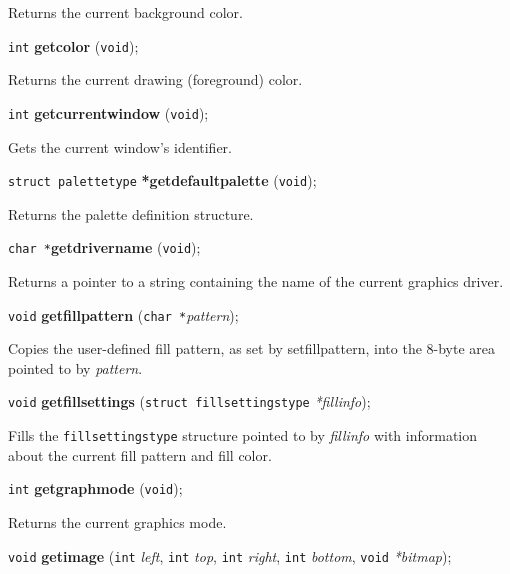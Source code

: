 \documentclass[a4paper,11pt]{article}
\newcommand{\V}{\texttt{void}}      %
\newcommand{\I}{\texttt{int}}       %
\newcommand{\C}{\texttt{char *}}    %
\newcommand{\func}[1]{\textbf{#1}}  %
\newcommand{\A}[1]{\emph{#1}}       %
\newenvironment{bgi}
{ %
  \begin{snugshade}
}
{ %
  \end{snugshade}
}
\begin{document}
Returns the current background color.


\begin{bgi}
\I{} \func{getcolor} (\V{});
\end{bgi}

Returns the current drawing (foreground) color.


\begin{bgi}
\I{} \func{getcurrentwindow} (\V{});
\end{bgi}

Gets the current window's identifier.


\begin{bgi}
\texttt{struct palettetype} \func{*getdefaultpalette} (\V{});
\end{bgi}

Returns the palette definition structure.


\begin{bgi}
\C{}\func{getdrivername} (\V{});
\end{bgi}

Returns a pointer to a string containing the name of the current
graphics driver.


\begin{bgi}
\V{} \func{getfillpattern} (\C{}\A{pattern}); 
\end{bgi}

Copies the user-defined fill pattern, as set by setfillpattern, into
the 8-byte area pointed to by \A{pattern}.


\begin{bgi}
\V{} \func{getfillsettings} (\texttt{struct fillsettingstype}
\A{*fillinfo});
\end{bgi}

Fills the \texttt{fillsettingstype} structure pointed to by
\A{fillinfo} with information about the current fill pattern and fill
color.


\begin{bgi}
\I{} \func{getgraphmode} (\V{});
\end{bgi}

Returns the current graphics mode.


\begin{bgi}
\V{} \func{getimage} (\I{} \A{left}, \I{} \A{top}, \I{} \A{right},
\I{} \A{bottom}, \V{} \A{*bitmap});
\end{bgi}
\end{document}
